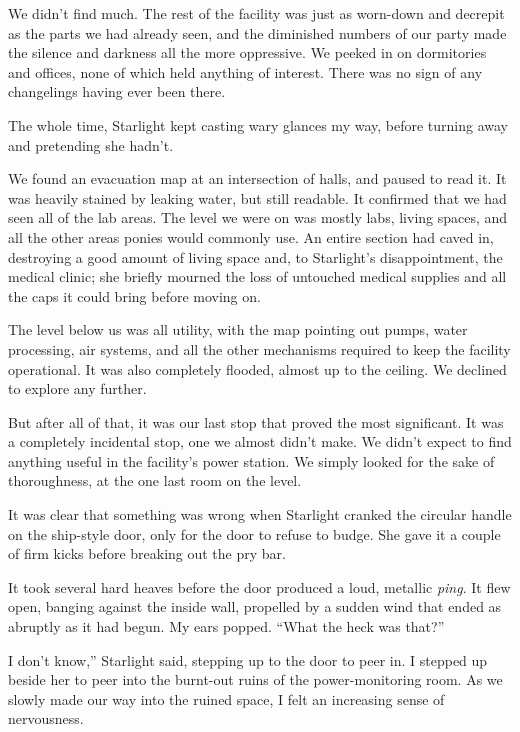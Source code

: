 We didn’t find much. The rest of the facility was just as worn-down and decrepit as the parts we had already seen, and the diminished numbers of our party made the silence and darkness all the more oppressive. We peeked in on dormitories and offices, none of which held anything of interest. There was no sign of any changelings having ever been there.

The whole time, Starlight kept casting wary glances my way, before turning away and pretending she hadn’t.

We found an evacuation map at an intersection of halls, and paused to read it. It was heavily stained by leaking water, but still readable. It confirmed that we had seen all of the lab areas. The level we were on was mostly labs, living spaces, and all the other areas ponies would commonly use. An entire section had caved in, destroying a good amount of living space and, to Starlight’s disappointment, the medical clinic; she briefly mourned the loss of untouched medical supplies and all the caps it could bring before moving on.

The level below us was all utility, with the map pointing out pumps, water processing, air systems, and all the other mechanisms required to keep the facility operational. It was also completely flooded, almost up to the ceiling. We declined to explore any further.

But after all of that, it was our last stop that proved the most significant. It was a completely incidental stop, one we almost didn’t make. We didn’t expect to find anything useful in the facility’s power station. We simply looked for the sake of thoroughness, at the one last room on the level.

It was clear that something was wrong when Starlight cranked the circular handle on the ship-style door, only for the door to refuse to budge. She gave it a couple of firm kicks before breaking out the pry bar.

It took several hard heaves before the door produced a loud, metallic \textit{ping}. It flew open, banging against the inside wall, propelled by a sudden wind that ended as abruptly as it had begun. My ears popped. “What the heck was that?”

\leavevmode{}I don’t know,” Starlight said, stepping up to the door to peer in. I stepped up beside her to peer into the burnt-out ruins of the power-monitoring room. As we slowly made our way into the ruined space, I felt an increasing sense of nervousness.

